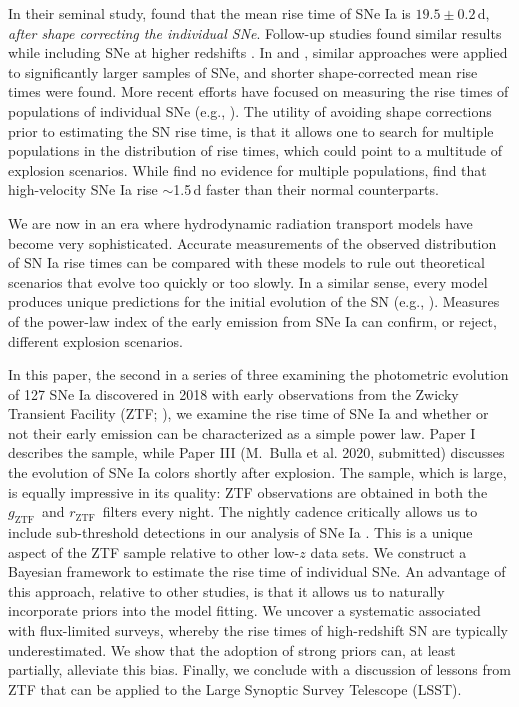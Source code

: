 \documentclass[twocolumn]{./aastex63}
\newcommand{\rztf}{$r_\mathrm{ZTF}$}
\newcommand{\gztf}{$g_\mathrm{ZTF}$}
\begin{document}
In their seminal study, \citet{Riess99a} found that the mean rise time of SNe Ia
is $19.5 \pm 0.2$\,d, \textit{after shape correcting the individual SNe}.
Follow-up studies found similar results while including SNe at higher redshifts
\citep{Conley06}. In \citet{Hayden10} and \citet{Ganeshalingam11}, similar
approaches were applied to significantly larger samples of SNe, and shorter
shape-corrected mean rise times were found. More recent efforts have focused on
measuring the rise times of populations of individual SNe (e.g.,
\citealt{Firth15,Zheng17a,Papadogiannakis19}). The utility of avoiding shape
corrections prior to estimating the SN rise time, is that it allows one to
search for multiple populations in the distribution of rise times, which could
point to a multitude of explosion scenarios. While \citet{Papadogiannakis19}
find no evidence for multiple populations, \citet{Ganeshalingam10} find that
high-velocity SNe Ia rise $\sim$1.5\,d faster than their normal counterparts.

We are now in an era where hydrodynamic radiation transport models have become
very sophisticated. Accurate measurements of the observed distribution of SN Ia
rise times can be compared with these models to rule out theoretical scenarios
that evolve too quickly or too slowly. In a similar sense, every model produces
unique predictions for the initial evolution of the SN (e.g.,
\citealt{Noebauer17}). Measures of the power-law index of the early emission
from SNe Ia can confirm, or reject, different explosion scenarios.

In this paper, the second in a series of three examining the photometric
evolution of 127 SNe Ia discovered in 2018 with early observations from the
Zwicky Transient Facility (ZTF; \citealt{Bellm19,Graham19}), we examine the rise
time of SNe Ia and whether or not their early emission can be characterized as a
simple power law. Paper I \citep{Yao19} describes the sample, while Paper III
(M.\ Bulla et al. 2020, submitted) discusses the evolution of SNe Ia colors
shortly after explosion. The sample, which is large, is equally impressive in
its quality: ZTF observations are obtained in both the \gztf\ and \rztf\ filters
every night. The nightly cadence critically allows us to include sub-threshold
detections in our analysis of SNe Ia \citep{Yao19}. This is a unique aspect of
the ZTF sample relative to other low-$z$ data sets. We construct a Bayesian
framework to estimate the rise time of individual SNe. An advantage of this
approach, relative to other studies, is that it allows us to naturally
incorporate priors into the model fitting. We uncover a systematic associated
with flux-limited surveys, whereby the rise times of high-redshift SN are
typically underestimated. We show that the adoption of strong priors can, at
least partially, alleviate this bias. Finally, we conclude with a discussion of
lessons from ZTF that can be applied to the Large Synoptic Survey Telescope
(LSST).
\end{document}
